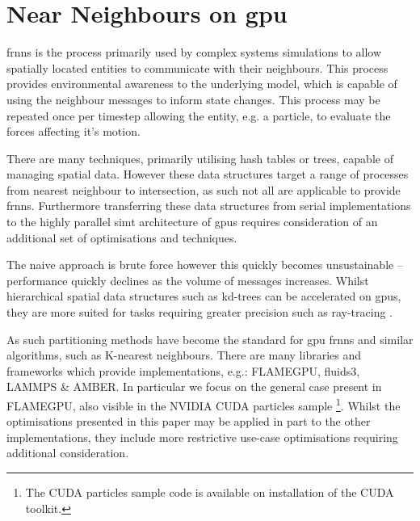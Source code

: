 \section{Near Neighbours on \gls{gpu}\label{sec:spatial-partitioning}}

\gls{frnns} is the process primarily used by complex systems simulations to allow spatially located entities to communicate with their neighbours. This process provides environmental awareness to the underlying model, which is capable of using the neighbour messages to inform state changes. This process may be repeated once per timestep allowing the entity, e.g. a particle, to evaluate the forces affecting it's motion.

There are many techniques, primarily utilising hash tables or trees, capable of managing spatial data. However these data structures target a range of processes from nearest neighbour to intersection, as such not all are applicable to provide \gls{frnns}. Furthermore transferring these data structures from serial implementations to the highly parallel \gls{simt} architecture of \glspl{gpu} requires consideration of an additional set of optimisations and techniques.

The naive approach is brute force however this quickly becomes unsustainable -- performance quickly declines as the volume of messages increases. Whilst hierarchical spatial data structures such as kd-trees can be accelerated on \glspl{gpu}, they are more suited for tasks requiring greater precision such as ray-tracing \cite{SSK07}.

As such partitioning methods have become the standard for \gls{gpu} \gls{frnns} and similar algorithms, such as K-nearest neighbours. There are many libraries and frameworks which provide implementations, e.g.: FLAMEGPU\cite{FLAMEGPU}, fluids3\cite{fluids3}, LAMMPS\cite{LAMMPS} \& AMBER\cite{AMBER,SG*13}. In particular we focus on the general case present in FLAMEGPU, also visible in the NVIDIA CUDA particles sample \cite{Gre10}\footnote{The CUDA particles sample code is available on installation of the CUDA toolkit.}. Whilst the optimisations presented in this paper may be applied in part to the other implementations, they include more restrictive use-case optimisations requiring additional consideration.


